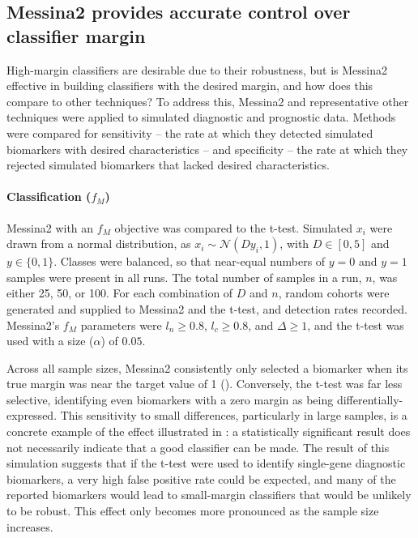 \documentclass[dissertation.tex]{subfiles}
\begin{document}
\subsection{Messina2 provides accurate control over classifier margin}
High-margin classifiers are desirable due to their robustness, but is Messina2 effective in building classifiers with the desired margin, and how does this compare to other techniques?  To address this, Messina2 and representative other techniques were applied to simulated diagnostic and prognostic data.  Methods were compared for sensitivity -- the rate at which they detected simulated biomarkers with desired characteristics -- and specificity -- the rate at which they rejected simulated biomarkers that lacked desired characteristics.

\paragraph{Classification ($f_M$)}
Messina2 with an $f_M$ objective was compared to the t-test.  Simulated $x_i$ were drawn from a normal distribution, as $x_i \sim \mathcal{N}(D y_i, 1)$, with $D \in [0, 5]$ and $y \in \{0, 1\}$.  Classes were balanced, so that near-equal numbers of $y = 0$ and $y = 1$ samples were present in all runs.  The total number of samples in a run, $n$, was either 25, 50, or 100.  For each combination of $D$ and $n$,  random cohorts were generated and supplied to Messina2 and the t-test, and detection rates recorded.  Messina2's $f_M$ parameters were $l_n \geq 0.8$, $l_c \geq 0.8$, and $\Delta \geq 1$, and the t-test was used with a size ($\alpha$) of $0.05$.

Across all sample sizes, Messina2 consistently only selected a biomarker when its true margin was near the target value of 1 ().  Conversely, the t-test was far less selective, identifying even biomarkers with a zero margin as being differentially-expressed.  This sensitivity to small differences, particularly in large samples, is a concrete example of the effect illustrated in : a statistically significant result does not necessarily indicate that a good classifier can be made.  The result of this simulation suggests that if the t-test were used to identify single-gene diagnostic biomarkers, a very high false positive rate could be expected, and many of the reported biomarkers would lead to small-margin classifiers that would be unlikely to be robust.  This effect only becomes more pronounced as the sample size increases.
\end{document}
